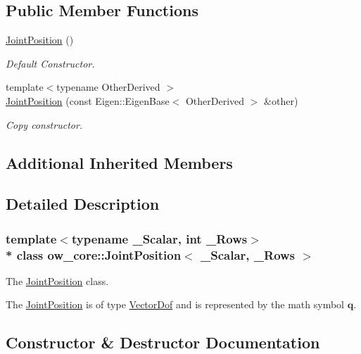 \subsection*{Public Member Functions}
\begin{DoxyCompactItemize}
\item 
\hyperlink{classow__core_1_1JointPosition_a563520837683450f7ee71f7ba462868d}{Joint\+Position} ()\hypertarget{classow__core_1_1JointPosition_a563520837683450f7ee71f7ba462868d}{}\label{classow__core_1_1JointPosition_a563520837683450f7ee71f7ba462868d}

\begin{DoxyCompactList}\small\item\em Default Constructor. \end{DoxyCompactList}\item 
{\footnotesize template$<$typename Other\+Derived $>$ }\\\hyperlink{classow__core_1_1JointPosition_a10fe7d31f9b0af2fea545f72eb4c12b0}{Joint\+Position} (const Eigen\+::\+Eigen\+Base$<$ Other\+Derived $>$ \&other)
\begin{DoxyCompactList}\small\item\em Copy constructor. \end{DoxyCompactList}\end{DoxyCompactItemize}
\subsection*{Additional Inherited Members}


\subsection{Detailed Description}
\subsubsection*{template$<$typename \+\_\+\+Scalar, int \+\_\+\+Rows$>$\\*
class ow\+\_\+core\+::\+Joint\+Position$<$ \+\_\+\+Scalar, \+\_\+\+Rows $>$}

The \hyperlink{classow__core_1_1JointPosition}{Joint\+Position} class. 

The \hyperlink{classow__core_1_1JointPosition}{Joint\+Position} is of type \hyperlink{classow__core_1_1VectorDof}{Vector\+Dof} and is represented by the math symbol $\mathbf{q}$. 

\subsection{Constructor \& Destructor Documentation}

